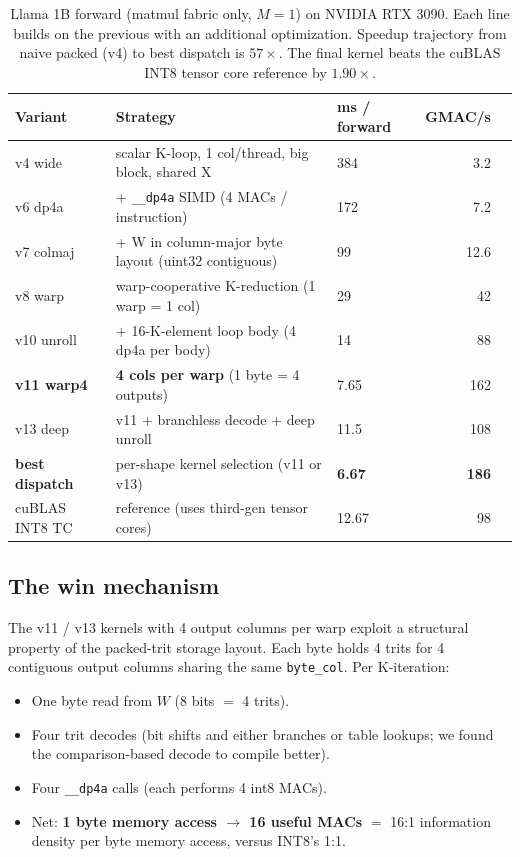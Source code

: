 \documentclass{article}
\begin{document}
\begin{table}[h]
\centering
\small
\begin{tabular}{lllrr}
\toprule
Variant & Strategy & ms / forward & {GMAC}/s \\
\midrule
v4 wide & scalar K-loop, 1 col/thread, big block, shared X & 384 & 3.2 \\
v6 dp4a & + \texttt{\_\_dp4a} {SIMD} (4 MACs / instruction) & 172 & 7.2 \\
v7 colmaj & + W in column-major byte layout (uint32 contiguous) & 99 & 12.6 \\
v8 warp & warp-cooperative K-reduction (1 warp = 1 col) & 29 & 42 \\
v10 unroll & + 16-K-element loop body (4 dp4a per body) & 14 & 88 \\
\textbf{v11 warp4} & \textbf{4 cols per warp} (1 byte = 4 outputs) & 7.65 & 162 \\
v13 deep & v11 + branchless decode + deep unroll & 11.5 & 108 \\
\midrule
\textbf{best dispatch} & per-shape kernel selection (v11 or v13) & \textbf{6.67} & \textbf{186} \\
\midrule
cuBLAS {INT8} TC & reference (uses third-gen tensor cores) & 12.67 & 98 \\
\bottomrule
\end{tabular}
\caption{Llama 1B forward (matmul fabric only, $M{=}1$) on {NVIDIA RTX 3090}.
Each line builds on the previous with an additional optimization. Speedup
trajectory from naive packed (v4) to best dispatch is $57\times$. The
final kernel beats the cuBLAS {INT8} tensor core reference by $1.90\times$.}
\end{table}

\subsection{The win mechanism}

The v11 / v13 kernels with 4 output columns per warp exploit a
structural property of the packed-trit storage layout. Each byte holds
4 trits for 4 contiguous output columns sharing the same
\texttt{byte\_col}. Per K-iteration:

\begin{itemize}
  \item One byte read from $W$ ($8$ bits $=$ 4 trits).
  \item Four trit decodes (bit shifts and either branches or table
    lookups; we found the comparison-based decode to compile better).
  \item Four \texttt{\_\_dp4a} calls (each performs 4 int8 MACs).
  \item Net: \textbf{1 byte memory access $\rightarrow$ 16 useful MACs}
    $=$ 16:1 information density per byte memory access, versus {INT8}'s
    1:1.
\end{itemize}
\end{document}
